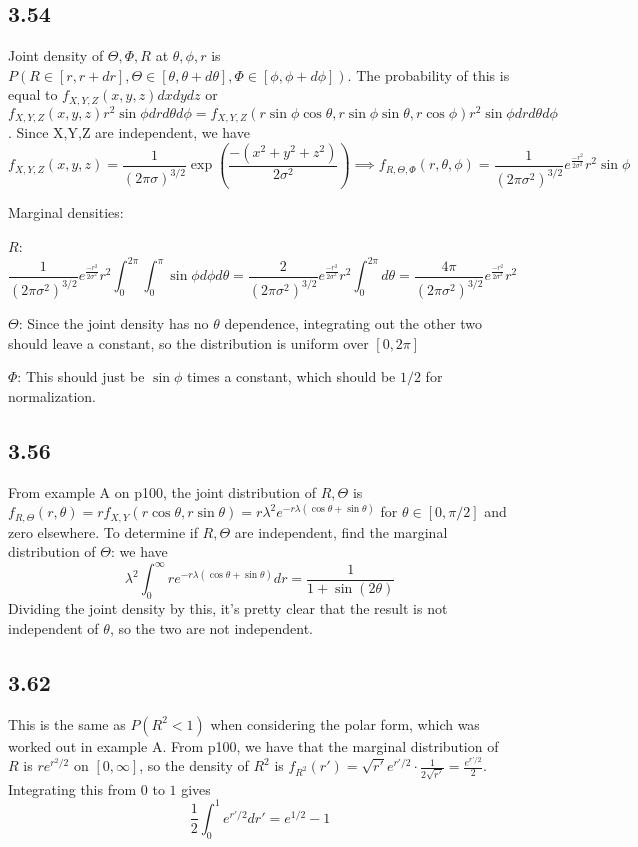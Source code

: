 \documentclass{article}
\begin{document}
\subsection*{3.54}
Joint density of $\Theta,\Phi,R$ at $\theta,\phi,r$ is $P(R\in[r,r+dr],\Theta\in[\theta,\theta+d\theta],\Phi\in[\phi,\phi+d\phi])$. The probability of this is equal to $f_{X,Y,Z}(x,y,z)dxdydz$ or $f_{X,Y,Z}(x,y,z)r^2\sin\phi dr d\theta d\phi=f_{X,Y,Z}(r\sin\phi\cos\theta,r\sin\phi\sin\theta,r\cos\phi)r^2\sin\phi drd\theta d\phi$. Since X,Y,Z are independent, we have $$f_{X,Y,Z}(x,y,z)=\frac{1}{(2\pi\sigma)^{3/2}}\exp\left(\frac{-(x^2+y^2+z^2)}{2\sigma^2}\right)\implies f_{R,\Theta,\Phi}(r,\theta,\phi)=\frac{1}{(2\pi\sigma^2)^{3/2}}e^{\frac{-r^2}{2\sigma^2}}r^2\sin\phi$$

Marginal densities:

$R$: $$\frac{1}{(2\pi\sigma^2)^{3/2}}e^{\frac{-r^2}{2\sigma^2}}r^2\int_0^{2\pi}\int_0^\pi\sin\phi d\phi d\theta=\frac{2}{(2\pi\sigma^2)^{3/2}}e^{\frac{-r^2}{2\sigma^2}}r^2\int_0^{2\pi} d\theta=\frac{4\pi}{(2\pi\sigma^2)^{3/2}}e^{\frac{-r^2}{2\sigma^2}}r^2$$

$\Theta$: Since the joint density has no $\theta$ dependence, integrating out the other two should leave a constant, so the distribution is uniform over $[0,2\pi]$

$\Phi$: This should just be $\sin\phi$ times a constant, which should be $1/2$ for normalization.
\subsection*{3.56}
From example A on p100, the joint distribution of $R,\Theta$ is $f_{R,\Theta}(r,\theta)=rf_{X,Y}(r\cos\theta,r\sin\theta)=r\lambda^2e^{-r\lambda(\cos\theta+\sin\theta)}$ for $\theta\in[0,\pi/2]$ and zero elsewhere. To determine if $R,\Theta$ are independent, find the marginal distribution of $\Theta$: we have 
$$\lambda^2\int_0^\infty re^{-r\lambda(\cos\theta+\sin\theta)}dr=\frac{1}{1+\sin(2\theta)}$$
Dividing the joint density by this, it's pretty clear that the result is not independent of $\theta$, so the two are not independent.
\subsection*{3.62}
This is the same as $P(R^2<1)$ when considering the polar form, which was worked out in example A. From p100, we have that the marginal distribution of $R$ is $re^{r^2/2}$ on $[0,\infty]$, so the density of $R^2$ is $f_{R^2}(r')=\sqrt{r'}e^{r'/2}\cdot\frac{1}{2\sqrt{r'}}=\frac{e^{r'/2}}{2}$. Integrating this from $0$ to $1$ gives $$\frac{1}{2}\int_0^1e^{r'/2}dr'=e^{1/2}-1$$
\end{document}
